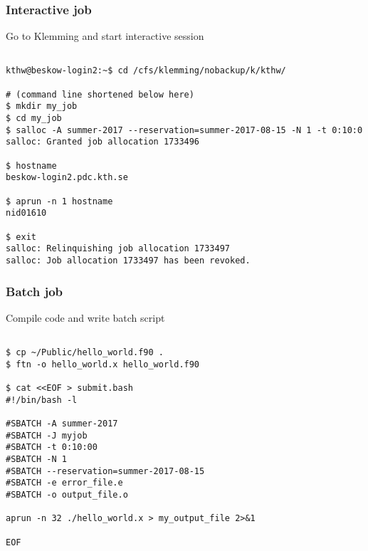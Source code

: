 \begin{frame}[fragile]
  \frametitle{Interactive job}
  \begin{alertblock}{Go to Klemming and start interactive session}
    \verbatimfont{\footnotesize}
    \begin{verbatim}

kthw@beskow-login2:~$ cd /cfs/klemming/nobackup/k/kthw/

# (command line shortened below here)
$ mkdir my_job
$ cd my_job
$ salloc -A summer-2017 --reservation=summer-2017-08-15 -N 1 -t 0:10:0
salloc: Granted job allocation 1733496

$ hostname
beskow-login2.pdc.kth.se

$ aprun -n 1 hostname
nid01610

$ exit
salloc: Relinquishing job allocation 1733497
salloc: Job allocation 1733497 has been revoked.

 \end{verbatim}
\end{alertblock}



\end{frame}



\begin{frame}[fragile]
  \frametitle{Batch job}
  \begin{alertblock}{Compile code and write batch script}
    \verbatimfont{\footnotesize}
    \begin{verbatim}

$ cp ~/Public/hello_world.f90 .
$ ftn -o hello_world.x hello_world.f90

$ cat <<EOF > submit.bash
#!/bin/bash -l

#SBATCH -A summer-2017
#SBATCH -J myjob
#SBATCH -t 0:10:00
#SBATCH -N 1
#SBATCH --reservation=summer-2017-08-15
#SBATCH -e error_file.e
#SBATCH -o output_file.o

aprun -n 32 ./hello_world.x > my_output_file 2>&1

EOF

 \end{verbatim}
\end{alertblock}


\end{frame}



